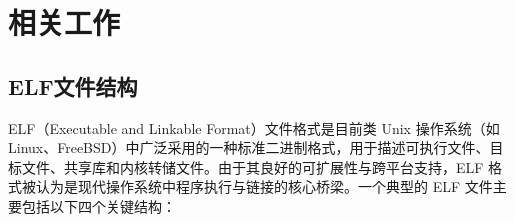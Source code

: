 %
%
%
%
%

\chapter{相关工作}
\section{ELF文件结构}
ELF（Executable and Linkable Format）文件格式是目前类 Unix 操作系统（如 Linux、FreeBSD）中广泛采用的一种标准二进制格式，用于描述可执行文件、目标文件、共享库和内核转储文件。由于其良好的可扩展性与跨平台支持，ELF 格式被认为是现代操作系统中程序执行与链接的核心桥梁。一个典型的 ELF 文件主要包括以下四个关键结构：

